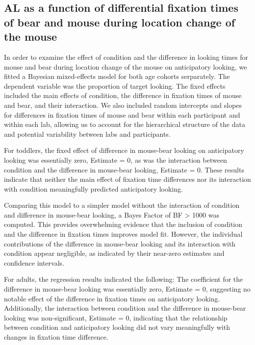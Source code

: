 \documentclass[
  man, donotrepeattitle,floatsintext]{apa6}
\begin{document}
\subsection{AL as a function of differential fixation times of bear and mouse during location change of the mouse}\label{al-as-a-function-of-differential-fixation-times-of-bear-and-mouse-during-location-change-of-the-mouse}

In order to examine the effect of condition and the difference in looking times for mouse and bear during location change of the mouse on anticipatory looking, we fitted a Bayesian mixed-effects model for both age cohorts serparately. The dependent variable was the proportion of target looking. The fixed effects included the main effects of condition, the difference in fixation times of mouse and bear, and their interaction. We also included random intercepts and slopes for differences in fixation times of mouse and bear within each participant and within each lab, allowing us to account for the hierarchical structure of the data and potential variability between labs and participants.

For toddlers, the fixed effect of difference in mouse-bear looking on anticipatory looking was essentially zero, Estimate = 0, as was the interaction between condition and the difference in mouse-bear looking, Estimate = 0. These results indicate that neither the main effect of fixation time differences nor its interaction with condition meaningfully predicted anticipatory looking.

Comparing this model to a simpler model without the interaction of condition and difference in mouse-bear looking, a Bayes Factor of BF \textgreater{} 1000 was computed. This provides overwhelming evidence that the inclusion of condition and the difference in fixation times improves model fit. However, the individual contributions of the difference in mouse-bear looking and its interaction with condition appear negligible, as indicated by their near-zero estimates and confidence intervals.

For adults, the regression results indicated the following:
The coefficient for the difference in mouse-bear looking was essentially zero, Estimate = 0, suggesting no notable effect of the difference in fixation times on anticipatory looking. Additionally, the interaction between condition and the difference in mouse-bear looking was non-significant, Estimate = 0, indicating that the relationship between condition and anticipatory looking did not vary meaningfully with changes in fixation time difference.
\end{document}
